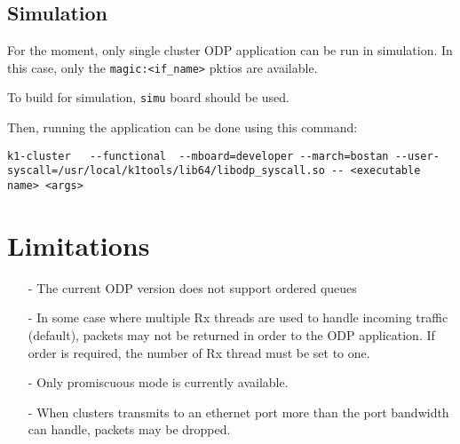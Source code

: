 \documentclass{trkalray}
\begin{document}
\subsection{Simulation}

For the moment, only single cluster ODP application can be run in
simulation. In this case, only the \texttt{magic:<if\_name>} pktios
are available.

To build for simulation, \texttt{simu} board should be used.

Then, running the application can be done using this command:
\begin{lstlisting}
k1-cluster   --functional  --mboard=developer --march=bostan --user-syscall=/usr/local/k1tools/lib64/libodp_syscall.so -- <executable name> <args>
\end{lstlisting}

\section{Limitations}

\begin{itemize}
\item[-]{The current ODP version does not support ordered queues}
\item[-]{In some case where multiple Rx threads are used to handle incoming traffic
  (default), packets may not be returned in order to the ODP
  application. If order is required, the number of Rx thread must be
  set to one.}
\item[-]{Only promiscuous mode is currently available.}
\item[-]{When clusters transmits to an ethernet port more than the port
  bandwidth can handle, packets may be dropped.}
\end{itemize}
\end{document}
